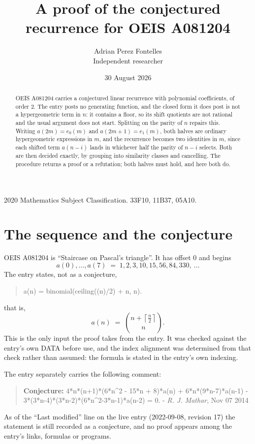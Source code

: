 \documentclass[11pt,a4paper]{article}
\title{A proof of the conjectured recurrence for OEIS A081204}
\author{Adrian Perez Fontelles\\ \small Independent researcher}
\date{30 August 2026}
\theoremstyle{plain}
\theoremstyle{definition}
\begin{document}
\maketitle

\begin{abstract}
OEIS A081204 carries a conjectured linear recurrence with polynomial coefficients, of
order 2. The entry posts no generating function, and the closed form it does post
is not a hypergeometric term in $n$: it contains a floor, so its shift quotients are not
rational and the usual argument does not start. Splitting on the parity of $n$ repairs
this. Writing $a(2m)=e_{0}(m)$ and $a(2m+1)=e_{1}(m)$, both halves are ordinary
hypergeometric expressions in $m$, and the recurrence becomes two identities in $m$, since
each shifted term $a(n-i)$ lands in whichever half the parity of $n-i$ selects. Both are
then decided exactly, by grouping into similarity classes and cancelling. The procedure
returns a proof or a refutation; both halves must hold, and here both do.
\end{abstract}

\noindent\small 2020 Mathematics Subject Classification. 33F10, 11B37, 05A10.\normalsize

\section{The sequence and the conjecture}

OEIS A081204 is ``Staircase on Pascal's triangle''. It has offset $0$ and begins
\[
a(0),\dots,a(7)\;=\;1, 2, 3, 10, 15, 56, 84, 330,\ \dots
\]
The entry states, not as a conjecture,
\begin{quote}\small
a(n) = binomial(ceiling((n)/2) + n, n).
\end{quote}
that is,
\begin{equation}\label{eq:cf}
a(n)\;=\;{\binom{n + \left\lceil{\frac{n}{2}}\right\rceil}{n}} .
\end{equation}
This is the only input the proof takes from the entry. It was checked against the entry's
own DATA before use, and the index alignment was determined from that check rather than
assumed: the formula is stated in the entry's own indexing.

The entry separately carries the following comment:
\begin{quote}\small
\textbf{Conjecture:} 4*n*(n+1)*(6*n\^{}2 - 15*n + 8)*a(n) + 6*n*(9*n-7)*a(n-1) - 3*(3*n-4)*(3*n-2)*(6*n\^{}2-3*n-1)*a(n-2) = 0. - \emph{R. J. Mathar}, Nov 07 2014
\end{quote}
As of the ``Last modified'' line on the live entry (2022-09-08, revision 17) the
statement is still recorded as a conjecture, and no proof appears among the entry's links,
formulas or programs.
\end{document}
